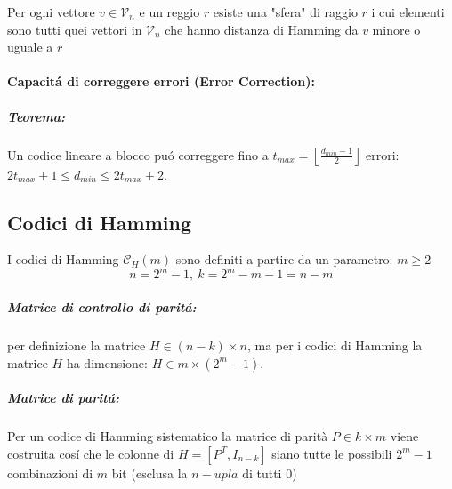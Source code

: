                 Per ogni vettore $v\in\mathcal{V}_n$ e un reggio $r$ esiste una "sfera" di raggio $r$ i cui elementi sono tutti quei vettori in $\mathcal{V}_n$ che hanno
                distanza di Hamming da $v$ minore o uguale a $r$

            \paragraph{Capacitá di correggere errori (Error Correction):}
                \subparagraph{Teorema:}\begin{sloppypar}
                Un codice lineare a blocco puó correggere fino a ${t_{max} = \left\lfloor \frac{d_{min}-1}{2} \right\rfloor}$ errori: $2t_{max}+1 \leq d_{min} \leq 2t_{max}+2$.
                \end{sloppypar}
    \subsection{Codici di Hamming}
        I codici di Hamming $\mathcal{C}_H(m)$ sono definiti a partire da un parametro: $m \geq 2$
        \[
            n = 2^m-1,\ k = 2^m-m-1 = n-m
        \]
        \subparagraph{Matrice di controllo di paritá:} per definizione la matrice $H \in (n-k)\times n$, ma per i codici di Hamming la matrice $H$ ha dimensione:
        $H \in m\times (2^m-1)$.

        \subparagraph{Matrice di paritá:} Per un codice di Hamming sistematico la matrice di parità $P\in k \times m$ viene costruita cosí che le colonne di $H = [P^T,I_{n-k}]$
        siano tutte le possibili $2^m-1$ combinazioni di $m$ bit (esclusa la $n-upla$ di tutti 0)
